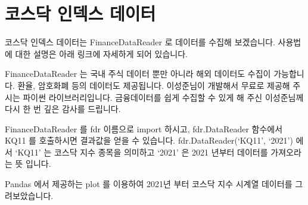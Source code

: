 \documentclass[letterpaper,10pt,english]{jupyterBook}
\begin{document}
\section{코스닥 인덱스 데이터}
\label{\detokenize{chapter4/4.4.2_Data_Collection:id1}}\label{\detokenize{chapter4/4.4.2_Data_Collection::doc}}
\sphinxAtStartPar
코스닥 인덱스 데이터는 FinanceDataReader 로 데이터를 수집해 보겠습니다.
사용법에 대한 설명은 아래 링크에 자세하게 되어 있습니다.

\sphinxAtStartPar
FinanceDataReader 는 국내 주식 데이터 뿐만 아니라 해외 데이터도 수집이 가능합니다. 환율, 암호화폐 등의 데이터도 제공됩니다.
이성준님이 개발해서 무료로 제공해 주시는 파이썬 라이브러리입니다. 금융데이터를 쉽게 수집할 수 있게 해 주신 이성준님께 다시 한 번 깊은 감사를 드립니다.

\sphinxAtStartPar
FinanceDataReader 를 fdr 이름으로 import 하시고, fdr.DataReader 함수에서 KQ11 를 호출하시면 결과값을 얻을 수 있습니다.
fdr.DataReader(‘KQ11’, ‘2021’) 에서 ‘KQ11’ 는 코스닥 지수 종목을 의미하고 ‘2021’ 은 2021 년부터 데이터를 가져오라는 뜻 입니다.

\sphinxAtStartPar
Pandas 에서 제공하는 plot 를 이용하여 2021년 부터 코스닥 지수 시계열 데이터를 그려보았습니다.
\end{document}
